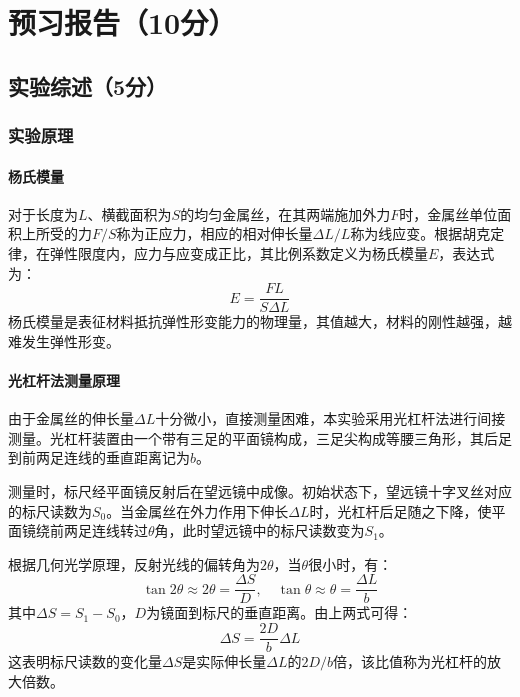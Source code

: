 \documentclass[]{../template/Report}%
\begin{document}
\maketitle%

\section{预习报告（10分）}
\subsection{实验综述（5分）}
\subsubsection{实验原理}
\paragraph{杨氏模量}
对于长度为$L$、横截面积为$S$的均匀金属丝，在其两端施加外力$F$时，金属丝单位面积上所受的力$F/S$称为正应力，相应的相对伸长量$\Delta L/L$称为线应变。根据胡克定律，在弹性限度内，应力与应变成正比，其比例系数定义为杨氏模量$E$，表达式为：
\begin{equation}
E = \frac{FL}{S\Delta L}
\end{equation}
杨氏模量是表征材料抵抗弹性形变能力的物理量，其值越大，材料的刚性越强，越难发生弹性形变。

\paragraph{光杠杆法测量原理}
由于金属丝的伸长量$\Delta L$十分微小，直接测量困难，本实验采用光杠杆法进行间接测量。光杠杆装置由一个带有三足的平面镜构成，三足尖构成等腰三角形，其后足到前两足连线的垂直距离记为$b$。

测量时，标尺经平面镜反射后在望远镜中成像。初始状态下，望远镜十字叉丝对应的标尺读数为$S_0$。当金属丝在外力作用下伸长$\Delta L$时，光杠杆后足随之下降，使平面镜绕前两足连线转过$\theta$角，此时望远镜中的标尺读数变为$S_1$。

根据几何光学原理，反射光线的偏转角为$2\theta$，当$\theta$很小时，有：
\begin{equation}
\tan 2\theta \approx 2\theta = \frac{\Delta S}{D}, \quad \tan \theta \approx \theta = \frac{\Delta L}{b}
\end{equation}
其中$\Delta S = S_1 - S_0$，$D$为镜面到标尺的垂直距离。由上两式可得：
\begin{equation}
\Delta S = \frac{2D}{b}\Delta L
\end{equation}
这表明标尺读数的变化量$\Delta S$是实际伸长量$\Delta L$的$2D/b$倍，该比值称为光杠杆的放大倍数。
\end{document}
